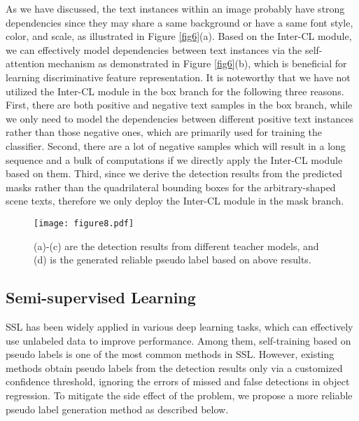 As we have discussed, the text instances within an image probably have strong dependencies since they may share a same background or have a same font style, color, and scale, as illustrated in Figure \ref{fig6}(a). Based on the Inter-CL module, we can effectively model dependencies between text instances via the self-attention mechanism as demonstrated in Figure \ref{fig6}(b), which is beneficial for learning discriminative feature representation. It is noteworthy that we have not utilized the Inter-CL module in the box branch for the following three reasons. First, there are both positive and negative text samples in the box branch, while we only need to model the dependencies between different positive text instances rather than those negative ones, which are primarily used for training the classifier. Second, there are a lot of negative samples which will result in a long sequence and a bulk of computations if we directly apply the Inter-CL module based on them. Third, since we derive the detection results from the predicted masks rather than the quadrilateral bounding boxes for the arbitrary-shaped scene texts, therefore we only deploy the Inter-CL module in the mask branch. 

\begin{figure*}[ht]
  \centering
  \texttt{[image: figure8.pdf]}
  \caption{(a)-(c) are the detection results from different teacher models, and (d) is the generated reliable pseudo label based on above results. }
  \label{fig8}
\end{figure*}

\subsection{Semi-supervised Learning}
\label{subsec:semisupervised}
SSL has been widely applied in various deep learning tasks, which can effectively use unlabeled data to improve performance. Among them, self-training based on pseudo labels is one of the most common methods in SSL. However, existing methods obtain pseudo labels from the detection results only via a customized confidence threshold, ignoring the errors of missed and false detections in object regression. To mitigate the side effect of the problem, we propose a more reliable pseudo label generation method as described below.



